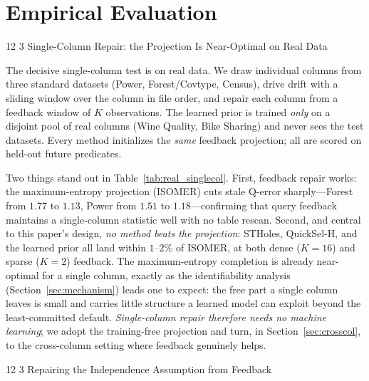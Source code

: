 \documentclass[preprint,12pt]{elsarticle}
\makeatletter
\renewcommand\subsection{\@startsection{subsection}{2}{\z@}%
           {12\p@ \@plus 6\p@ \@minus 3\p@}%
           {3\p@ \@plus 6\p@ \@minus 3\p@}%
           {\normalfont\normalsize\bfseries}}
\makeatother
\begin{document}
\section{Empirical Evaluation}
\label{sec:evaluation}

\subsection{Single-Column Repair: the Projection Is Near-Optimal on Real Data}
\label{sec:single-column-results}
\label{sec:projection-init}

The decisive single-column test is on real data. We draw individual columns from three
standard datasets (Power, Forest/Covtype, Census), drive drift with a sliding window over the
column in file order, and repair each column from a feedback window of $K$ observations. The
learned prior is trained \emph{only} on a disjoint pool of real columns (Wine Quality, Bike
Sharing) and never sees the test datasets. Every method initializes the \emph{same} feedback
projection; all are scored on held-out future predicates.



Two things stand out in Table~\ref{tab:real_singlecol}. First, feedback repair works: the
maximum-entropy projection (ISOMER) cuts stale Q-error sharply---Forest from $1.77$ to
$1.13$, Power from $1.51$ to $1.18$---confirming that query feedback maintains a single-column
statistic well with no table rescan. Second, and central to this paper's design, \emph{no
method beats the projection}: STHoles, QuickSel-H, and the learned prior all land within
$1$--$2\%$ of ISOMER, at both dense ($K{=}16$) and sparse ($K{=}2$) feedback. The
maximum-entropy completion is already near-optimal for a single column, exactly as the
identifiability analysis (Section~\ref{sec:mechanism}) leads one to expect: the free part a
single column leaves is small and carries little structure a learned model can exploit beyond
the least-committed default. \emph{Single-column repair therefore needs no machine learning};
we adopt the training-free projection and turn, in Section~\ref{sec:crosscol}, to the
cross-column setting where feedback genuinely helps.

\subsection{Repairing the Independence Assumption from Feedback}
\label{sec:crosscol}
\end{document}
